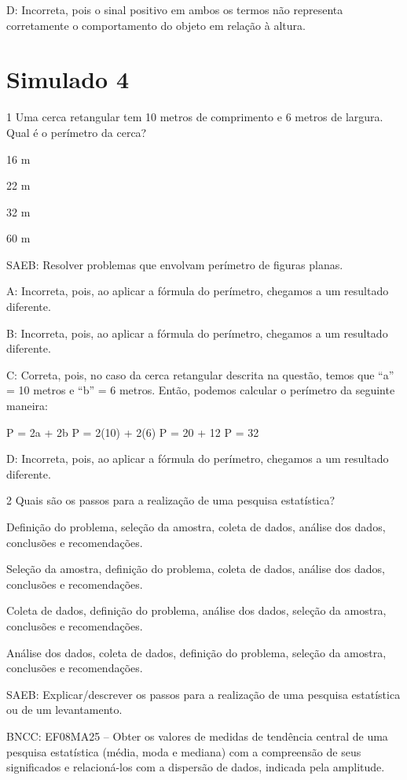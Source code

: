 {D: Incorreta, pois o sinal positivo em ambos os termos não representa
corretamente o comportamento do objeto em relação à altura.


\section*{Simulado 4}

\num{1} Uma cerca retangular tem 10 metros de comprimento e 6 metros de
largura. Qual é o perímetro da cerca?
\item 16 m
\item 22 m
\item 32 m
\item 60 m

SAEB: Resolver problemas que envolvam perímetro de figuras planas.

A: Incorreta, pois, ao aplicar a fórmula do perímetro, chegamos a um
resultado diferente.

B: Incorreta, pois, ao aplicar a fórmula do perímetro, chegamos a um
resultado diferente.

C: Correta, pois, no caso da cerca retangular descrita na questão, temos
que ``a'' = 10 metros e ``b'' = 6 metros. Então, podemos calcular o
perímetro da seguinte maneira:

P = 2a + 2b P = 2(10) + 2(6) P = 20 + 12 P = 32

D: Incorreta, pois, ao aplicar a fórmula do perímetro, chegamos a um
resultado diferente.

\num{2} Quais são os passos para a realização de uma pesquisa estatística?
\item Definição do problema, seleção da amostra, coleta de dados, análise
dos dados, conclusões e recomendações.
\item Seleção da amostra, definição do problema, coleta de dados, análise
dos dados, conclusões e recomendações.
\item Coleta de dados, definição do problema, análise dos dados, seleção da
amostra, conclusões e recomendações.
\item Análise dos dados, coleta de dados, definição do problema, seleção da
amostra, conclusões e recomendações.

SAEB: Explicar/descrever os passos para a realização de uma pesquisa
estatística ou de um levantamento.

BNCC: EF08MA25 -- Obter os valores de medidas de tendência central de
uma pesquisa estatística (média, moda e mediana) com a compreensão de
seus significados e relacioná-los com a dispersão de dados, indicada
pela amplitude.

}

